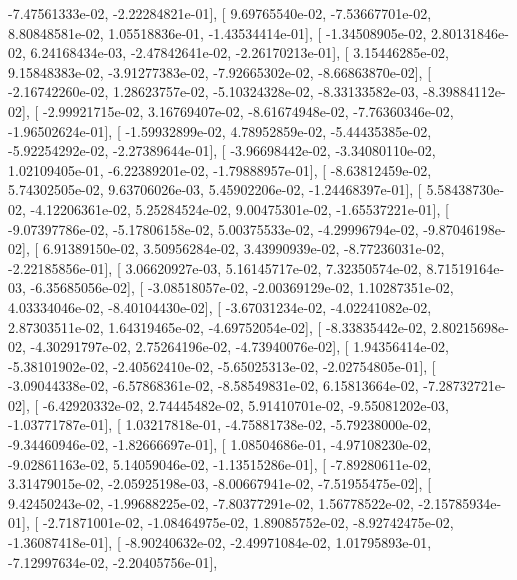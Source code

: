 \documentclass{article}
\begin{document}
         -7.47561333e-02,  -2.22284821e-01],
       [  9.69765540e-02,  -7.53667701e-02,   8.80848581e-02,
          1.05518836e-01,  -1.43534414e-01],
       [ -1.34508905e-02,   2.80131846e-02,   6.24168434e-03,
         -2.47842641e-02,  -2.26170213e-01],
       [  3.15446285e-02,   9.15848383e-02,  -3.91277383e-02,
         -7.92665302e-02,  -8.66863870e-02],
       [ -2.16742260e-02,   1.28623757e-02,  -5.10324328e-02,
         -8.33133582e-03,  -8.39884112e-02],
       [ -2.99921715e-02,   3.16769407e-02,  -8.61674948e-02,
         -7.76360346e-02,  -1.96502624e-01],
       [ -1.59932899e-02,   4.78952859e-02,  -5.44435385e-02,
         -5.92254292e-02,  -2.27389644e-01],
       [ -3.96698442e-02,  -3.34080110e-02,   1.02109405e-01,
         -6.22389201e-02,  -1.79888957e-01],
       [ -8.63812459e-02,   5.74302505e-02,   9.63706026e-03,
          5.45902206e-02,  -1.24468397e-01],
       [  5.58438730e-02,  -4.12206361e-02,   5.25284524e-02,
          9.00475301e-02,  -1.65537221e-01],
       [ -9.07397786e-02,  -5.17806158e-02,   5.00375533e-02,
         -4.29996794e-02,  -9.87046198e-02],
       [  6.91389150e-02,   3.50956284e-02,   3.43990939e-02,
         -8.77236031e-02,  -2.22185856e-01],
       [  3.06620927e-03,   5.16145717e-02,   7.32350574e-02,
          8.71519164e-03,  -6.35685056e-02],
       [ -3.08518057e-02,  -2.00369129e-02,   1.10287351e-02,
          4.03334046e-02,  -8.40104430e-02],
       [ -3.67031234e-02,  -4.02241082e-02,   2.87303511e-02,
          1.64319465e-02,  -4.69752054e-02],
       [ -8.33835442e-02,   2.80215698e-02,  -4.30291797e-02,
          2.75264196e-02,  -4.73940076e-02],
       [  1.94356414e-02,  -5.38101902e-02,  -2.40562410e-02,
         -5.65025313e-02,  -2.02754805e-01],
       [ -3.09044338e-02,  -6.57868361e-02,  -8.58549831e-02,
          6.15813664e-02,  -7.28732721e-02],
       [ -6.42920332e-02,   2.74445482e-02,   5.91410701e-02,
         -9.55081202e-03,  -1.03771787e-01],
       [  1.03217818e-01,  -4.75881738e-02,  -5.79238000e-02,
         -9.34460946e-02,  -1.82666697e-01],
       [  1.08504686e-01,  -4.97108230e-02,  -9.02861163e-02,
          5.14059046e-02,  -1.13515286e-01],
       [ -7.89280611e-02,   3.31479015e-02,  -2.05925198e-03,
         -8.00667941e-02,  -7.51955475e-02],
       [  9.42450243e-02,  -1.99688225e-02,  -7.80377291e-02,
          1.56778522e-02,  -2.15785934e-01],
       [ -2.71871001e-02,  -1.08464975e-02,   1.89085752e-02,
         -8.92742475e-02,  -1.36087418e-01],
       [ -8.90240632e-02,  -2.49971084e-02,   1.01795893e-01,
         -7.12997634e-02,  -2.20405756e-01],
\end{document}
